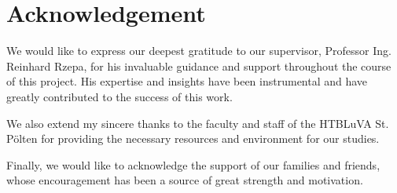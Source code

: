 \section*{Acknowledgement} 
We would like to express our deepest gratitude to our supervisor, Professor
Ing. Reinhard Rzepa, for his invaluable guidance and support throughout the 
course of this project. His expertise and insights have been instrumental and
have greatly contributed to the success of this work. \npar

We also extend my sincere thanks to the faculty and staff of the 
HTBLuVA St. Pölten for providing the necessary resources and 
environment for our studies. \npar

Finally, we would like to acknowledge the support of our families and friends,
whose encouragement has been a source of great strength and motivation.
